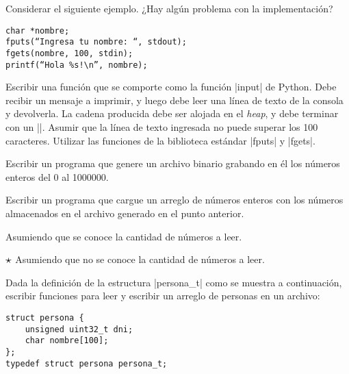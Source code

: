 \begin{ejercicio}
Considerar el siguiente ejemplo. ¿Hay algún problema con la implementación?

\begin{lstlisting}[numbers=none]
char *nombre;
fputs(“Ingresa tu nombre: “, stdout);
fgets(nombre, 100, stdin);
printf(“Hola %s!\n”, nombre);
\end{lstlisting}
\end{ejercicio}

\begin{ejercicio}
Escribir una función que se comporte como la función |input| de Python. Debe
recibir un mensaje a imprimir, y luego debe leer una línea de texto de la
consola y devolverla. La cadena producida debe ser alojada en el \emph{heap},
y debe terminar con un |\0|. Asumir que la línea de texto ingresada
no puede superar los 100 caracteres. Utilizar las funciones de la
biblioteca estándar |fputs| y |fgets|.
\end{ejercicio}

\begin{ejercicio}
Escribir un programa que genere un archivo binario grabando en él los números
enteros del 0 al 1000000.
\end{ejercicio}

\begin{ejercicio}
Escribir un programa que cargue un arreglo de números enteros con los números
almacenados en el archivo generado en el punto anterior.

\begin{partes}
  \item Asumiendo que se conoce la cantidad de números a leer.
  \item $\dificil$ Asumiendo que no se conoce la cantidad de números a leer.
\end{partes}
\end{ejercicio}

\begin{ejercicio}
Dada la definición de la estructura |persona_t| como se muestra a continuación, escribir
funciones para leer y escribir un arreglo de personas en un archivo:

\begin{lstlisting}[numbers=none]
struct persona {
    unsigned uint32_t dni;
    char nombre[100];
};
typedef struct persona persona_t;
\end{lstlisting}
\end{ejercicio}
